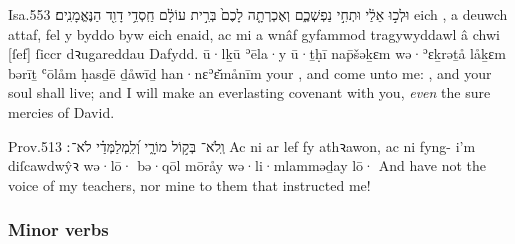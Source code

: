 \begin{example}{Isa.}{55}{3}{}{}
	\quoling
	{  וּלְכ֣וּ אֵלַ֔י  וּתְחִ֣י נַפְשְׁכֶ֑ם וְאֶכְרְתָ֤ה לָכֶם֙ בְּרִ֣ית עוֹלָ֔ם חַֽסְדֵ֥י דָוִ֖ד הַנֶּאֱמָנִֽים׃}
	{ eich , a deuwch attaf,  fel y byddo byw eich enaid, ac mi a wnâf gyfammod tragywyddawl â chwi [ſef] ſiccr dꝛugareddau Dafydd.}
	{  ū·lḵū ʾēla·y  ū·ṯḥī nap̄šəḵɛm wə·ʾɛḵrəṯå låḵɛm bərīṯ ʿōlåm ḥasḏē ḏåwīḏ han·nɛʾɛ̆månīm}
	{ your , and come unto me: , and your soul shall live; and I will make an everlasting covenant with you, \textit{even} the sure mercies of David.}
\end{example}

\begin{example}{Prov.}{5}{13}{}{}
	\quoling
	{וְֽלֹא־ בְּק֣וֹל מוֹרָ֑י וְ֝לִֽמְלַמְּדַ֗י לֹא־ ׃}
	{Ac ni  ar lef fy athꝛawon, ac ni  fyng- i’m diſcawdwŷꝛ}
	{wə·lō· bə·qōl mōråy wə·li·mlamməḏay lō· }
	{And have not  the voice of my teachers, nor  mine  to them that instructed me!}
\end{example}



\subsubsection{Minor verbs}




